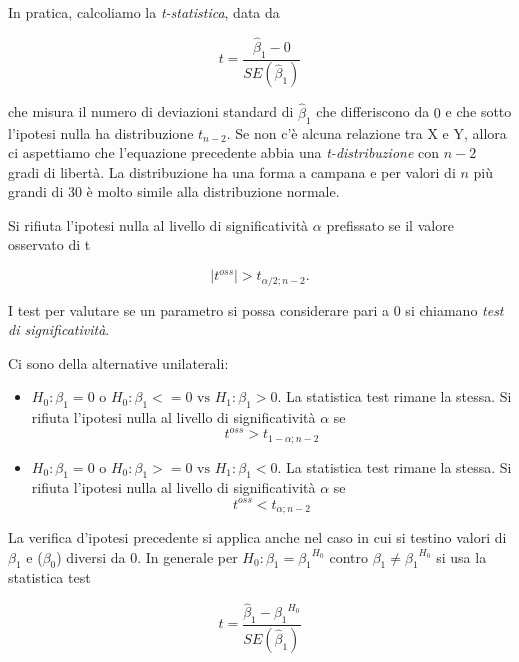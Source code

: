 In pratica, calcoliamo la \textit{t-statistica}, data da

\begin{equation}
t = \frac{{\hat{\beta}}_1 - 0}{SE({\hat{\beta}}_1)}
\end{equation}

che misura il numero di deviazioni standard di ${\hat{\beta}}_1$ che differiscono da $0$ e che sotto l'ipotesi nulla ha distribuzione $t_{n-2}$. Se non c'è alcuna relazione tra X e Y, allora ci aspettiamo che l'equazione precedente abbia una \textit{t-distribuzione} con $n - 2$ gradi di libertà. La distribuzione ha una forma a campana e per valori di $n$ più grandi di 30 è molto simile alla distribuzione normale.

Si rifiuta l'ipotesi nulla al livello di significatività $\alpha$ prefissato se il valore osservato di t

\begin{equation}
|t^{oss}| > t_{{\alpha}/2;n-2}.
\end{equation}

I test per valutare se un parametro si possa considerare pari a 0 si chiamano \textit{test di significatività}.

Ci sono della alternative unilaterali:

\begin{itemize}
\item $H_{0}: {\beta}_1 = 0 \text{ o } H_{0}: {\beta}_1 <= 0 \text{ vs } H_{1}:{\beta}_1 > 0$. La statistica test rimane la stessa. Si rifiuta l'ipotesi nulla al livello di significatività $\alpha$ se
\begin{equation}
t^{oss} > t_{1-\alpha;n-2}
\end{equation}
\item $H_{0}: {\beta}_1 = 0 \text{ o } H_{0}: {\beta}_1 >= 0 \text{ vs } H_{1}:{\beta}_1 < 0$. La statistica test rimane la stessa. Si rifiuta l'ipotesi nulla al livello di significatività $\alpha$ se
\begin{equation}
t^{oss} < t_{\alpha;n-2}
\end{equation}
\end{itemize}

La verifica d'ipotesi precedente si applica anche nel caso in cui si testino valori di ${\beta}_1$ e (${\beta}_0$) diversi da 0. In generale per $H_0: {\beta}_1 = {{\beta}_1}^{H_0}$ contro ${\beta}_1 \neq {{\beta}_1}^{H_0}$ si usa la statistica test

\begin{equation}
t = \frac{{\hat{\beta}}_1 - {{\beta}_1}^{H_0}}{SE({\hat{\beta}}_1)}
\end{equation}

